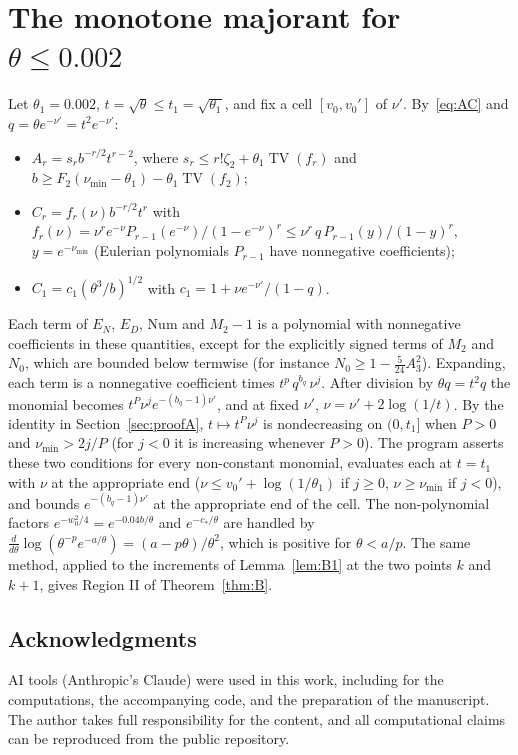\documentclass[11pt]{amsart}
\theoremstyle{definition}
\theoremstyle{remark}
\numberwithin{equation}{section}
\newcommand{\TV}{\operatorname{TV}}
\begin{document}
\section{The monotone majorant for \texorpdfstring{$\theta\le0.002$}{theta <= 0.002}}\label{app:regionII}

Let $\theta_1=0.002$, $t=\sqrt\theta\le t_1=\sqrt{\theta_1}$, and fix a cell $[v_0,v_0']$ of $\nu'$. By~\eqref{eq:AC} and
$q=\theta e^{-\nu'}=t^2e^{-\nu'}$:
\begin{itemize}
\item $A_r=s_rb^{-r/2}t^{r-2}$, where $s_r\le r!\zeta_2+\theta_1\TV(f_r)$ and $b\ge F_2(\nu_{\min}-\theta_1)-\theta_1\TV(f_2)$;
\item $C_r=f_r(\nu)b^{-r/2}t^r$ with $f_r(\nu)=\nu^re^{-\nu}P_{r-1}(e^{-\nu})/(1-e^{-\nu})^r\le\nu^r\,q\,P_{r-1}(y)/(1-y)^r$,
  $y=e^{-\nu_{\min}}$ (Eulerian polynomials $P_{r-1}$ have nonnegative coefficients);
\item $C_1=c_1(\theta^3/b)^{1/2}$ with $c_1=1+\nu e^{-\nu'}/(1-q)$.
\end{itemize}
Each term of $E_N$, $E_D$, $\mathrm{Num}$ and $M_2-1$ is a polynomial with nonnegative coefficients in these quantities, except for the
explicitly signed terms of $M_2$ and $N_0$, which are bounded below termwise (for instance $N_0\ge1-\frac5{24}A_3^2$). Expanding, each term
is a nonnegative coefficient times $t^p\,q^{b_q}\,\nu^j$. After division by $\theta q=t^2q$ the monomial becomes
$t^P\nu^je^{-(b_q-1)\nu'}$, and at fixed $\nu'$, $\nu=\nu'+2\log(1/t)$. By the identity in Section~\ref{sec:proofA}, $t\mapsto t^P\nu^j$ is
nondecreasing on $(0,t_1]$ when $P>0$ and $\nu_{\min}>2j/P$ (for $j<0$ it is increasing whenever $P>0$). The program asserts these two
conditions for every non-constant monomial, evaluates each at $t=t_1$ with $\nu$ at the appropriate end ($\nu\le v_0'+\log(1/\theta_1)$ if $j\ge0$,
$\nu\ge\nu_{\min}$ if $j<0$), and bounds $e^{-(b_q-1)\nu'}$ at the appropriate end of the cell. The non-polynomial factors
$e^{-w_0^2/4}=e^{-0.04b/\theta}$ and $e^{-c_\ast/\theta}$ are handled by
$\frac{d}{d\theta}\log(\theta^{-p}e^{-a/\theta})=(a-p\theta)/\theta^2$, which is positive for $\theta<a/p$. The same method, applied to
the increments of Lemma~\ref{lem:B1} at the two points $k$ and $k+1$, gives Region II of Theorem~\ref{thm:B}.

\subsection*{Acknowledgments}
AI tools (Anthropic's Claude) were used in this work, including for the computations, the accompanying code, and the preparation
of the manuscript. The author takes full responsibility for the content, and all computational claims can be reproduced from the
public repository.
\end{document}
